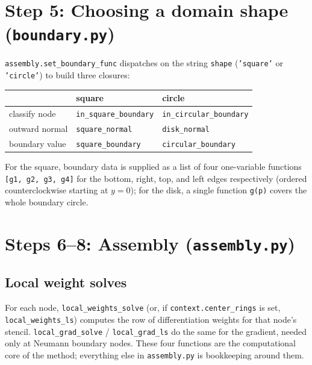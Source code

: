 \documentclass[11pt]{article}
\begin{document}
\section{Step 5: Choosing a domain shape (\texttt{boundary.py})}

\texttt{assembly.set\_boundary\_func} dispatches on the string
\texttt{shape} (\texttt{'square'} or \texttt{'circle'}) to build three
closures:

\begin{center}
\begin{tabular}{@{}lll@{}}
\toprule
& \textbf{square} & \textbf{circle} \\
\midrule
classify node & \texttt{in\_square\_boundary} & \texttt{in\_circular\_boundary} \\
outward normal & \texttt{square\_normal} & \texttt{disk\_normal} \\
boundary value & \texttt{square\_boundary} & \texttt{circular\_boundary} \\
\bottomrule
\end{tabular}
\end{center}

For the square, boundary data is supplied as a list of four
one-variable functions \texttt{[g1, g2, g3, g4]} for the bottom,
right, top, and left edges respectively (ordered counterclockwise
starting at $y=0$); for the disk, a single function \texttt{g(p)}
covers the whole boundary circle.

\section{Steps 6--8: Assembly (\texttt{assembly.py})}

\subsection{Local weight solves}

For each node, \texttt{local\_weights\_solve} (or, if
\texttt{context.center\_rings} is set, \texttt{local\_weights\_ls})
computes the row of differentiation weights for that node's stencil.
\texttt{local\_grad\_solve} / \texttt{local\_grad\_ls} do the same for
the gradient, needed only at Neumann boundary nodes. These four
functions are the computational core of the method; everything else
in \texttt{assembly.py} is bookkeeping around them.
\end{document}
